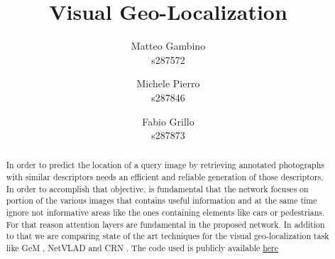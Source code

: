 \documentclass[10pt,twocolumn,letterpaper]{article}
\begin{document}
	
\title{Visual Geo-Localization}

\author{Matteo Gambino\\
	s287572
	\and
	Michele Pierro\\
	s287846
	\and
	Fabio Grillo\\
	s287873
}
\maketitle

\begin{abstract}
	In order to predict the location of a query image by retrieving annotated photographs with 
	similar descriptors needs an efficient and reliable generation of those descriptors. 
	In order to accomplish that objective, is fundamental that the network focuses on portion
	of the various images that contains useful information and at the same time ignore not 
	informative areas like the ones containing elements like cars or pedestrians. For that 
	reason attention layers are fundamental in the proposed network. In addition to that we 
	are comparing state of the art techniques for the visual geo-localization task like GeM \cite{GEM}, 
	NetVLAD \cite{NETVLAD} and CRN \cite{CRN}. The code used is publicly available 
	\href{https://github.com/matteo6198/project_visual_geolocalization}{here}
\end{abstract}

\end{document}
